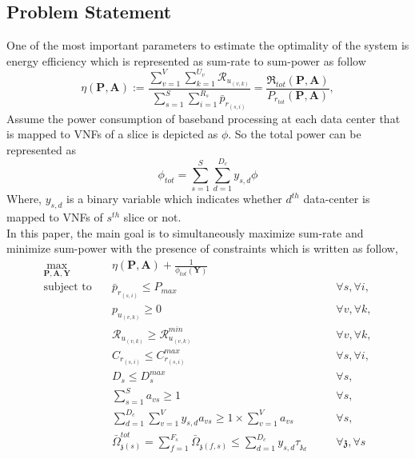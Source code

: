 \documentclass[conference]{IEEEtran}
\begin{document}
\subsection{Problem Statement}
One of the most important parameters to estimate the optimality of the system is energy efficiency which is represented as sum-rate to sum-power as follow
\begin{equation}
\eta(\boldsymbol{P},\boldsymbol{A}) := \frac{\sum\limits_{v=1}^{V} \sum\limits_{k=1}^{{U}_v}\mathcal{R}_{u_{(v,k)}} }{\sum\limits_{s=1}^{S} \sum\limits_{i=1}^{{R}_s}\bar{p}_{r_{(s,i)}}} = \frac{\mathfrak{R}_{tot}(\boldsymbol{P},\boldsymbol{A})}{P_{r_{tot}}(\boldsymbol{P},\boldsymbol{A})},
\end{equation}
Assume the power consumption of baseband processing at each data center that is mapped to VNFs of a slice is depicted as
$\phi$. So the total power can be represented as  
\begin{equation*}
\phi_{tot} = \sum_{s=1}^{S}\sum_{d=1}^{D_c}y_{s,d}\phi
\end{equation*} 
Where, $y_{s,d}$ is a binary variable which indicates whether $d^{th}$ data-center is mapped to VNFs of $s^{th}$ slice or not.\\
In this paper, the main goal is to simultaneously maximize sum-rate and minimize sum-power with the presence of constraints which is written as follow, 
\begin{subequations}
\begin{alignat}{4}
\max\limits_{\boldsymbol{P}, \boldsymbol{A}, \boldsymbol{Y} }   \quad &   \eta(\boldsymbol{P},\boldsymbol{A})+\frac{1}{\phi_{tot}(\boldsymbol{Y})} \\
\text{subject to} \quad  & \bar{p}_{r_{(s,i)}} \leq P_{max} && \quad \forall s, \forall i, 
 \label{c11} \\
&p_{u_{(v,k)}}  \geq 0  &&\quad \forall v, \forall k,\label{c12} \\
&\mathcal{R}_{u_{(v,k)}} \geq  \mathcal{R}_{u_{(v,k)}}^{min} && \quad \forall v, \forall k,\label{c13} \\                                 
&C_{r_{(s,i)}} \leq C_{r_{(s,i)}}^{max}  &&\quad \forall s, \forall i, \label{c14}\\
&D_{s} \leq D_{s}^{max}  &&\quad \forall s,\label{c15} \\
& \sum_{s=1}^{S}a_{vs} \geq 1 &&\quad \forall s, \label{c21} \\
& \sum_{d=1}^{D_c}\sum_{v=1}^{V}y_{s,d}a_{vs} \geq 1\times\sum_{v=1}^{V}a_{vs} &&\quad \forall s,\label{c23} \\
& \bar{\Omega}_{\mathfrak{z}(s)}^{tot} = \sum_{f=1}^{F_s}\bar{\Omega}_{\mathfrak{z}(f,s)} \leq  \sum_{d=1}^{D_c} y_{s,d} \tau_{\mathfrak{z}_d}                      
 && \quad \forall \mathfrak{z}, \forall s  \label{c22}
\end{alignat}
\label{constraints}
\end{subequations}
\end{document}
